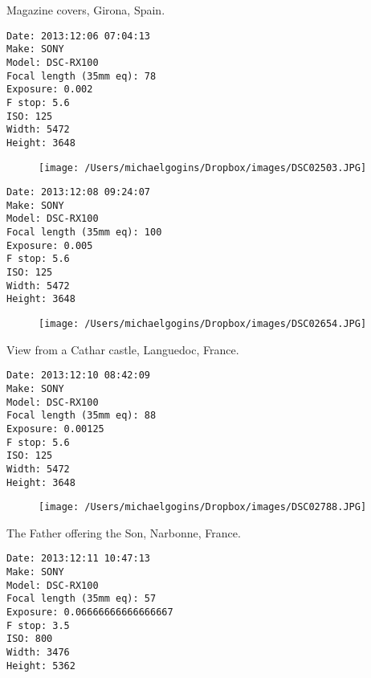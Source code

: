 \documentclass[11pt,letter,DIV=14,paper=landscape]{scrbook}
\begin{document}
\clearpage
\noindent Magazine covers, Girona, Spain.
\noindent
\begin{lstlisting}
Date: 2013:12:06 07:04:13
Make: SONY
Model: DSC-RX100
Focal length (35mm eq): 78
Exposure: 0.002
F stop: 5.6
ISO: 125
Width: 5472
Height: 3648
\end{lstlisting}
\clearpage

\begin{figure}
\texttt{[image: /Users/michaelgogins/Dropbox/images/DSC02503.JPG]}
\end{figure}
    
\clearpage
\noindent 
\noindent
\begin{lstlisting}
Date: 2013:12:08 09:24:07
Make: SONY
Model: DSC-RX100
Focal length (35mm eq): 100
Exposure: 0.005
F stop: 5.6
ISO: 125
Width: 5472
Height: 3648
\end{lstlisting}
\clearpage

\begin{figure}
\texttt{[image: /Users/michaelgogins/Dropbox/images/DSC02654.JPG]}
\end{figure}
    
\clearpage
\noindent View from a Cathar castle, Languedoc, France.
\noindent
\begin{lstlisting}
Date: 2013:12:10 08:42:09
Make: SONY
Model: DSC-RX100
Focal length (35mm eq): 88
Exposure: 0.00125
F stop: 5.6
ISO: 125
Width: 5472
Height: 3648
\end{lstlisting}
\clearpage

\begin{figure}
\texttt{[image: /Users/michaelgogins/Dropbox/images/DSC02788.JPG]}
\end{figure}
    
\clearpage
\noindent The Father offering the Son, Narbonne, France.
\noindent
\begin{lstlisting}
Date: 2013:12:11 10:47:13
Make: SONY
Model: DSC-RX100
Focal length (35mm eq): 57
Exposure: 0.06666666666666667
F stop: 3.5
ISO: 800
Width: 3476
Height: 5362
\end{lstlisting}
\clearpage
\end{document}
